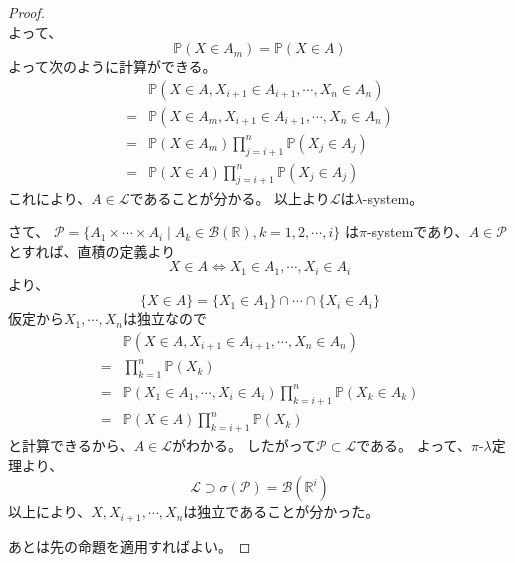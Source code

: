 \documentclass[11pt, a4paper]{jsarticle}
\theoremstyle{definition}
\newcommand{\RR}{{\mathbb{R}}} %
\newcommand{\PP}{{\mathbb{P}}} %
\newcommand{\BB}{{\mathcal{B}}} %
\begin{document}
\begin{proof}
\[        \]
        よって、
        \[
          \PP(X \in A_m) = \PP(X \in A)
        \]
        よって次のように計算ができる。
        \begin{align*}
          &\PP(X \in A, X_{i+1} \in A_{i+1}, \cdots, X_n \in A_n) \\
          =&\PP(X \in A_m, X_{i+1} \in A_{i+1}, \cdots, X_n \in A_n) \\
          =&\PP(X \in A_m)\prod_{j = i+1}^n \PP(X_j \in A_j) \\
          =&\PP(X \in A)\prod_{j = i+1}^n \PP(X_j \in A_j)
        \end{align*}
        これにより、$A \in \mathcal{L}$であることが分かる。
        以上より$\mathcal{L}$は$\lambda$-system。

        さて、
        $\mathcal{P} = \{A_1 \times \cdots \times A_i \mid A_k \in \BB(\RR) , k = 1, 2, \cdots, i\}$
        は$\pi$-systemであり、$A \in \mathcal{P}$とすれば、直積の定義より
        \[
          X \in A \Leftrightarrow X_1 \in A_1, \cdots, X_i \in A_i
        \]
        より、
        \[
          \{X \in A\} = \{X_1 \in A_1\} \cap \cdots \cap \{X_i \in A_i\}
        \]
        仮定から$X_1 ,\cdots , X_n$は独立なので
        \begin{align*}
            &\PP(X \in A ,X_{i+1} \in A_{i+1}, \cdots, X_n \in A_n) \\
            =& \prod_{k=1}^n\PP(X_k) \\
            =& \PP(X_1 \in A_1, \cdots, X_i \in A_i)\prod_{k=i+1}^n\PP(X_k \in A_k) \\
            =& \PP(X \in A)\prod_{k=i+1}^n\PP(X_k)
        \end{align*}
        と計算できるから、$A \in \mathcal{L}$がわかる。
        したがって$\mathcal{P} \subset \mathcal{L}$である。
        よって、$\pi$-$\lambda$定理より、
        \[
          \mathcal{L} \supset \sigma(\mathcal{P}) = \BB(\RR^i)
        \]
        以上により、$X, X_{i+1}, \cdots, X_n$は独立であることが分かった。

        あとは先の命題を適用すればよい。
      \end{proof}
\end{document}
